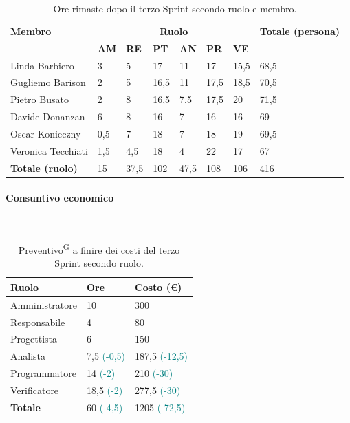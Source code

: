 \documentclass[8pt]{article}
\newcommand{\glossterm}[1]{#1\textsuperscript{G}} %
\newcommand{\subsubsubsection}[1]{\paragraph{#1}\mbox{}\\}
\begin{document}
\begin{table}[ht!]
	\centering
	\begin{tabular}{p{4cm} p{1cm} p{1cm} p{1cm} p{1cm} p{1cm} p{1cm} p{3cm}}
		\toprule
        \textbf{Membro} & \multicolumn{6}{c}{\textbf{Ruolo}} & \textbf{Totale (persona)}\\
		& \textbf{AM} & \textbf{RE} & \textbf{PT} & \textbf{AN} & \textbf{PR} & \textbf{VE}\\
		\midrule
        Linda Barbiero & 3 & 5 & 17 & 11 & 17 & 15,5 & 68,5 \\ 
        Gugliemo Barison & 2 & 5 & 16,5 & 11 & 17,5 & 18,5 & 70,5 \\ 
        Pietro Busato & 2 & 8 & 16,5 & 7,5 & 17,5 & 20 & 71,5 \\ 
        Davide Donanzan & 6 & 8 & 16 & 7 & 16 & 16 & 69 \\ 
        Oscar Konieczny & 0,5 & 7 & 18 & 7 & 18 & 19 & 69,5 \\ 
        Veronica Tecchiati & 1,5 & 4,5 & 18 & 4 & 22 & 17 & 67 \\
        \midrule
        \textbf{Totale (ruolo)} & 15 & 37,5 & 102 & 47,5 & 108 & 106 & 416 \\ 
        \bottomrule
    \end{tabular}
	\caption{Ore rimaste dopo il terzo Sprint secondo ruolo e membro.}
	\label{table:Ore rimaste dopo il terzo Sprint secondo ruolo e membro.}
\end{table}
\subsubsubsection{Consuntivo economico}
\begin{table}[ht!]
    \centering
	\begin{tabular}{p{4cm} p{3cm} p{4cm}}
        \toprule
        \textbf{Ruolo} & \textbf{Ore} & \textbf{Costo (€)} \\
        \midrule
        Amministratore & 10 & 300 \\ 
        Responsabile & 4 & 80 \\ 
        Progettista & 6 & 150 \\ 
        Analista & 7,5 \textcolor{teal}{(-0,5)} & 187,5 \textcolor{teal}{(-12,5)} \\ 
        Programmatore & 14 \textcolor{teal}{(-2)} & 210 \textcolor{teal}{(-30)} \\ 
        Verificatore & 18,5 \textcolor{teal}{(-2)} & 277,5 \textcolor{teal}{(-30)} \\
        \midrule
        \textbf{Totale} & 60 \textcolor{teal}{(-4,5)} & 1205 \textcolor{teal}{(-72,5)} \\ 
    \bottomrule
    \end{tabular}
    \caption{\glossterm{Preventivo} a finire dei costi del terzo Sprint secondo ruolo.}
    \label{table:Preventivo a finire dei costi del terzo Sprint secondo ruolo}
\end{table}
\end{document}
